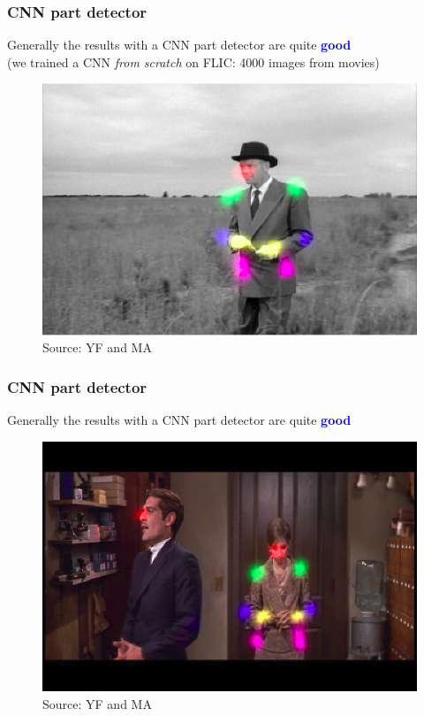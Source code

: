 \documentclass{beamer}
\newcommand\blue[1]{\textcolor{blue}{\textbf{#1}}}
\begin{document}
    
    \begin{frame}[c]
    	\frametitle{CNN part detector}
    	\begin{center}
    		Generally the results with a CNN part detector are quite \blue{good} \\
    		(we trained a CNN \textit{from scratch} on FLIC: 4000 images from movies)
    		\begin{figure}
    			\includegraphics[scale=0.38]{cnn_pd_nice1.png} \\
    			\scriptsize Source: YF and MA
    		\end{figure} 
    	\end{center}
    \end{frame}

    \begin{frame}[c]
    	\frametitle{CNN part detector}
    	\begin{center}
    		Generally the results with a CNN part detector are quite \blue{good}
    		\begin{figure}
    			\includegraphics[scale=0.4]{cnn_pd_nice2.png} \\
    			\scriptsize Source: YF and MA
    		\end{figure} 
    	\end{center}
    \end{frame}
    
\end{document}
